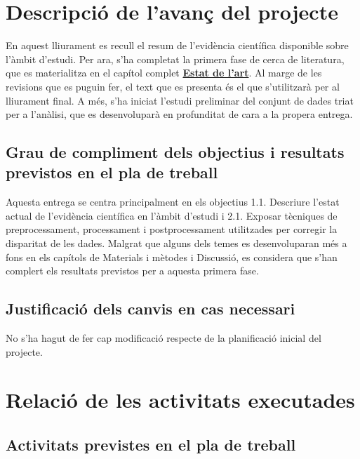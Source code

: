 \documentclass[CAT]{TFUOC}%
\begin{document}
\section{Descripció de l'avanç del projecte}\label{descripciuxf3-de-lavanuxe7-del-projecte}

En aquest lliurament es recull el resum de l'evidència científica disponible sobre l'àmbit d'estudi. Per ara, s'ha completat la primera fase de cerca de literatura, que es materialitza en el capítol complet \textbf{\hyperref[estat-de-lart]{Estat de l'art}}. Al marge de les revisions que es puguin fer, el text que es presenta és el que s'utilitzarà per al lliurament final. A més, s'ha iniciat l'estudi preliminar del conjunt de dades triat per a l'anàlisi, que es desenvoluparà en profunditat de cara a la propera entrega.

\subsection{Grau de compliment dels objectius i resultats previstos en el pla de treball}\label{grau-de-compliment-dels-objectius-i-resultats-previstos-en-el-pla-de-treball}

Aquesta entrega se centra principalment en els objectius 1.1. Descriure l'estat actual de l'evidència científica en l'àmbit d'estudi i 2.1. Exposar tècniques de preprocessament, processament i postprocessament utilitzades per corregir la disparitat de les dades. Malgrat que alguns dels temes es desenvoluparan més a fons en els capítols de Materials i mètodes i Discussió, es considera que s'han complert els resultats previstos per a aquesta primera fase.

\subsection{Justificació dels canvis en cas necessari}\label{justificaciuxf3-dels-canvis-en-cas-necessari}

No s'ha hagut de fer cap modificació respecte de la planificació inicial del projecte.

\section{Relació de les activitats executades}\label{relaciuxf3-de-les-activitats-executades}

\subsection{Activitats previstes en el pla de treball}\label{activitats-previstes-en-el-pla-de-treball}
\end{document}
